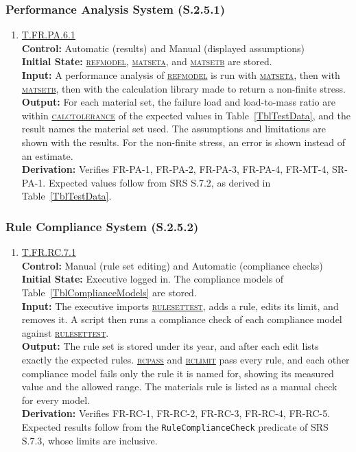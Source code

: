 \documentclass[12pt, titlepage]{article}
\newcommand{\testdef}[1]{\leavevmode\hypertarget{test:#1}{}\hyperlink{trace:#1}{#1}}
\DeclareRobustCommand{\cname}[1]{{\renewcommand{\_}{\textunderscore\allowbreak}\textsc{#1}}}
\newcommand{\constfirst}[1]{\leavevmode\hypertarget{constfirst:\detokenize{#1}}{}\hyperlink{const:\detokenize{#1}}{\cname{#1}}}
\newcommand{\const}[1]{\hyperlink{const:\detokenize{#1}}{\cname{#1}}}
\begin{document}
\subsubsection{Performance Analysis System (S.2.5.1)}

\begin{enumerate}

\item \testdef{T.FR.PA.6.1}\\
\textbf{Control:} Automatic (results) and Manual (displayed assumptions)\\
\textbf{Initial State:} \const{ref\_model}, \const{mat\_set\_a}, and
\constfirst{mat\_set\_b} are stored.\\
\textbf{Input:} A performance analysis of \const{ref\_model} is run with
\const{mat\_set\_a}, then with \const{mat\_set\_b}, then with the calculation
library made to return a non-finite stress.\\
\textbf{Output:} For each material set, the failure load and load-to-mass ratio
are within \const{calc\_tolerance} of the expected values in
Table~\ref{TblTestData}, and the result names the material set used. The
assumptions and limitations are shown with the results. For the non-finite
stress, an error is shown instead of an estimate.\\
\textbf{Derivation:} Verifies FR-PA-1, FR-PA-2, FR-PA-3, FR-PA-4, FR-MT-4,
SR-PA-1. Expected values follow from SRS S.7.2, as derived in
Table~\ref{TblTestData}.

\end{enumerate}

\subsubsection{Rule Compliance System (S.2.5.2)}

\begin{enumerate}

\item \testdef{T.FR.RC.7.1}\\
\textbf{Control:} Manual (rule set editing) and Automatic (compliance checks)\\
\textbf{Initial State:} Executive logged in. The compliance models of
Table~\ref{TblComplianceModels} are stored.\\
\textbf{Input:} The executive imports \constfirst{ruleset\_test}, adds a rule, edits
its limit, and removes it. A script then runs a compliance check of each
compliance model against \const{ruleset\_test}.\\
\textbf{Output:} The rule set is stored under its year, and after each edit lists
exactly the expected rules. \constfirst{rc\_pass} and \constfirst{rc\_limit} pass every
rule, and each other compliance model fails only the rule it is named for,
showing its measured value and the allowed range. The materials rule is listed
as a manual check for every model.\\
\textbf{Derivation:} Verifies FR-RC-1, FR-RC-2, FR-RC-3, FR-RC-4, FR-RC-5.
Expected results follow from the \texttt{RuleComplianceCheck} predicate of SRS
S.7.3, whose limits are inclusive.

\end{enumerate}
\end{document}
